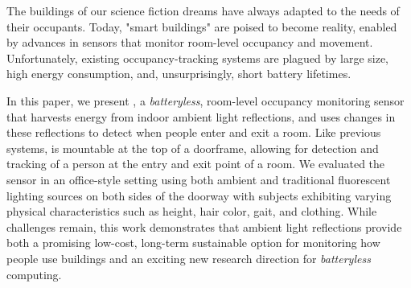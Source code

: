 The buildings of our science fiction dreams have always adapted to the needs of their occupants.
Today, "smart buildings" are poised to become reality, enabled by advances in sensors that monitor room-level occupancy and movement.
Unfortunately, existing occupancy-tracking systems are plagued by large size, high energy consumption, and, unsurprisingly, short battery lifetimes.

In this paper, we present \sysname, a \textit{batteryless}, room-level occupancy monitoring sensor that harvests energy from indoor ambient light reflections, and uses changes in these reflections to detect when people enter and exit a room.
Like previous systems, \sysname is mountable at the top of a doorframe, allowing for detection and tracking of a person at the entry and exit point of a room.
We evaluated the \sysname sensor in an office-style setting using both ambient and traditional fluorescent lighting sources on both sides of the doorway with subjects exhibiting varying physical characteristics such as height, hair color, gait, and clothing.
While challenges remain, this work demonstrates that ambient light reflections provide both a promising low-cost, long-term sustainable option for monitoring how people use buildings and an exciting new research direction for \textit{batteryless} computing.
